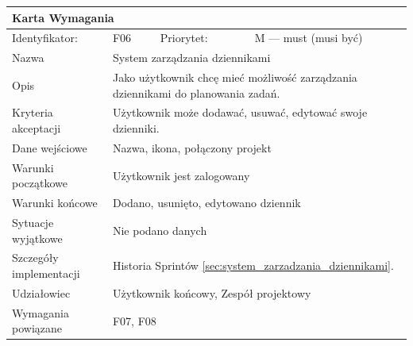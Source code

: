 \documentclass[a4paper,11pt]{report}
\begin{document}
		\begin{tabular}{|p{3cm}|p{2cm}|p{2cm}|p{6cm}|}
		\hline
		\multicolumn{4}{|p{12 cm}|}{Karta Wymagania}\\
		\hline
		Identyfikator: & F06 & Priorytet: & M — must (musi być)\\
		\hline
		Nazwa & \multicolumn{3}{|p{10 cm}|}{System zarządzania dziennikami}\\
		\hline
		Opis & \multicolumn{3}{|p{10 cm}|}{Jako użytkownik chcę mieć możliwość zarządzania dziennikami do planowania zadań.}\\
		\hline
		Kryteria akceptacji & \multicolumn{3}{|p{10 cm}|}{Użytkownik może dodawać, usuwać, edytować swoje dzienniki.}\\
		\hline
		Dane wejściowe & \multicolumn{3}{|p{10 cm}|}{Nazwa, ikona, połączony projekt}\\
		\hline
		Warunki początkowe & \multicolumn{3}{|p{10 cm}|}{Użytkownik jest zalogowany}\\
		\hline
		Warunki końcowe & \multicolumn{3}{|p{10 cm}|}{Dodano, usunięto, edytowano dziennik}\\
		\hline
		Sytuacje wyjątkowe & \multicolumn{3}{|p{10 cm}|}{Nie podano danych}\\
		\hline
		Szczegóły implementacji & \multicolumn{3}{|p{10 cm}|}{Historia Sprintów \ref{sec:system_zarzadzania_dziennikami}.}\\
		\hline
		Udziałowiec & \multicolumn{3}{|p{10 cm}|}{Użytkownik końcowy, Zespół projektowy}\\
		\hline
		Wymagania powiązane & \multicolumn{3}{|p{10 cm}|}{F07, F08}\\
		\hline
		\end{tabular}
		\newline
		\vspace*{0,2 cm}
		\newline
\end{document}
